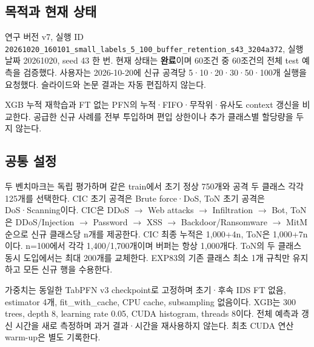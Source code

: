 

\subsection{목적과 현재 상태}
연구 버전 v7, 실행 ID \texttt{20261020\allowbreak{}\_\allowbreak{}\allowbreak{}160101\_\allowbreak{}\allowbreak{}small\_\allowbreak{}\allowbreak{}la\allowbreak{}bels\_\allowbreak{}\allowbreak{}5\_\allowbreak{}\allowbreak{}1\allowbreak{}00\_\allowbreak{}\allowbreak{}buffe\allowbreak{}r\_\allowbreak{}\allowbreak{}retent\allowbreak{}ion\_\allowbreak{}\allowbreak{}s43\_\allowbreak{}\allowbreak{}3204a372\allowbreak{}}, 실행 날짜 20261020, seed 43 한 번. 현재 상태는 \textbf{완료}이며 60조건 중 60조건의 전체 test 예측을 검증했다. 사용자는 2026-10-20에 신규 공격당 5·10·20·30·50·100개 실행을 요청했다. 슬라이드와 논문 결과는 자동 편집하지 않는다.

XGB 누적 재학습과 FT 없는 PFN의 누적·FIFO·무작위·유사도 context 갱신을 비교한다. 공급한 신규 사례를 전부 투입하며 편입 상한이나 추가 클래스별 할당량을 두지 않는다.

\subsection{공통 설정}
두 벤치마크는 독립 평가하며 같은 train에서 초기 정상 750개와 공격 두 클래스 각각 125개를 선택한다. CIC 초기 공격은 Brute force·DoS, ToN 초기 공격은 DoS·Scanning이다. CIC은 DDoS \ensuremath{\rightarrow} Web attacks \ensuremath{\rightarrow} Infiltration \ensuremath{\rightarrow} Bot, ToN은 DDoS/\allowbreak{}Injection \ensuremath{\rightarrow} Password \ensuremath{\rightarrow} XSS \ensuremath{\rightarrow} Backdoor/\allowbreak{}Ransomware \ensuremath{\rightarrow} MitM 순으로 신규 클래스당 n개를 제공한다. CIC 최종 누적은 1,000+\allowbreak{}4n, ToN은 1,000+\allowbreak{}7n이다. n=\allowbreak{}100에서 각각 1,400/\allowbreak{}1,700개이며 버퍼는 항상 1,000개다. ToN의 두 클래스 동시 도입에서는 최대 200개를 교체한다. EXP83의 기존 클래스 최소 1개 규칙만 유지하고 모든 신규 행을 수용한다.

가중치는 동일한 TabPFN v3 checkpoint로 고정하며 초기·후속 IDS FT 없음, estimator 4개, fit\_\allowbreak{}with\_\allowbreak{}cache, CPU cache, subsampling 없음이다. XGB는 300 trees, depth 8, learning rate 0.05, CUDA histogram, threads 8이다. 전체 예측과 갱신 시간을 새로 측정하며 과거 결과·시간을 재사용하지 않는다. 최초 CUDA 연산 warm-up은 별도 기록한다.

